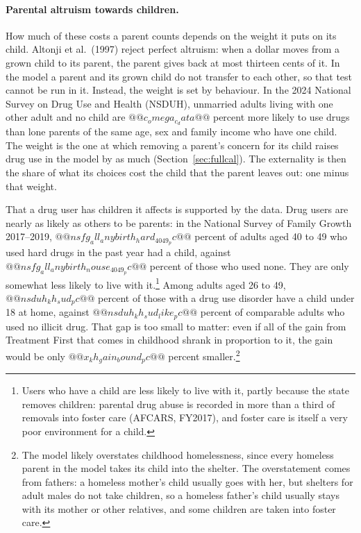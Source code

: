 \documentclass[10pt]{article}
\begin{document}
\paragraph{Parental altruism towards children.} How much of these costs a parent counts depends on the weight it puts on its child. Altonji et al.\ (1997) reject perfect altruism: when a dollar moves from a grown child to its parent, the parent gives back at most thirteen cents of it. In the model a parent and its grown child do not transfer to each other, so that test cannot be run in it. Instead, the weight is set by behaviour. In the 2024 National Survey on Drug Use and Health (NSDUH), unmarried adults living with one other adult and no child are $@@c_omega_c_data@@$ percent more likely to use drugs than lone parents of the same age, sex and family income who have one child. The weight is the one at which removing a parent's concern for its child raises drug use in the model by as much (Section~\ref{sec:fullcal}). The externality is then the share of what its choices cost the child that the parent leaves out: one minus that weight.

That a drug user has children it affects is supported by the data. Drug users are nearly as likely as others to be parents: in the National Survey of Family Growth 2017--2019, $@@nsfg_all_anybirth_hard_4049_pc@@$ percent of adults aged 40 to 49 who used hard drugs in the past year had a child, against $@@nsfg_all_anybirth_nouse_4049_pc@@$ percent of those who used none. They are only somewhat less likely to live with it.\footnote{Users who have a child are less likely to live with it, partly because the state removes children: parental drug abuse is recorded in more than a third of removals into foster care (AFCARS, FY2017), and foster care is itself a very poor environment for a child.} Among adults aged 26 to 49, $@@nsduh_kh_sud_pc@@$ percent of those with a drug use disorder have a child under 18 at home, against $@@nsduh_kh_sud_like_pc@@$ percent of comparable adults who used no illicit drug. That gap is too small to matter: even if all of the gain from Treatment First that comes in childhood shrank in proportion to it, the gain would be only $@@x_kh_gain_bound_pc@@$ percent smaller.\footnote{The model likely overstates childhood homelessness, since every homeless parent in the model takes its child into the shelter. The overstatement comes from fathers: a homeless mother's child usually goes with her, but shelters for adult males do not take children, so a homeless father's child usually stays with its mother or other relatives, and some children are taken into foster care.}
\end{document}
